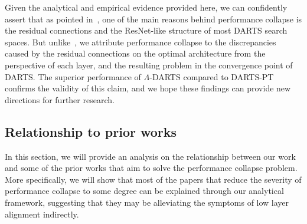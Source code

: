 \documentclass{article} \usepackage{fancyhdr, iclr2023_conference, times}
\newcommand{\mydarts}{$\Lambda$-DARTS\xspace}
\begin{document}
\par Given the analytical and empirical evidence provided here, we can confidently assert that as pointed in~\citep{DBLP:conf/iclr/WangCCTH21}, one of the main reasons behind performance collapse is the residual connections and the ResNet-like structure of most DARTS search spaces. But unlike~\citep{DBLP:conf/iclr/WangCCTH21}, we attribute performance collapse to the discrepancies caused by the residual connections on the optimal architecture from the perspective of each layer, and the resulting problem in the convergence point of DARTS. The superior performance of \mydarts compared to DARTS-PT confirms the validity of this claim, and we hope these findings can provide new directions for further research.
\subsection{Relationship to prior works}
\label{sec:appndx-priorwork}
In this section, we will provide an analysis on the relationship between our work and some of the prior works that aim to solve the performance collapse problem. More specifically, we will show that most of the papers that reduce the severity of performance collapse to some degree can be explained through our analytical framework, suggesting that they may be alleviating the symptoms of low layer alignment indirectly.
\end{document}
